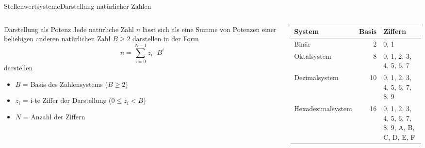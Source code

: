 \documentclass[xelatex,aspectratio=169]{beamer}
\begin{document}
\begin{frame}{Stellenwertsysteme}{Darstellung natürlicher Zahlen}
  \begin{columns}
    \begin{column}{0.5\textwidth}
      \begin{block}{Darstellung als Potenz}
        Jede natürliche Zahl \(n\) lässt sich als eine Summe von Potenzen einer beliebigen anderen natürlichen Zahl \(B \geq 2 \) darstellen in der Form
        \[
          n = \sum_{i=0}^{N-1} z_i \cdot B^i
        \]
        darstellen
        \begin{itemize}
          \item \(B\) = Basis des Zahlensystems (\(B \geq 2\))
          \item \(z_i\) = i-te Ziffer der Darstellung (\(0 \leq z_i < B\))
          \item \(N\) = Anzahl der Ziffern
        \end{itemize}
      \end{block}
    \end{column}
    \begin{column}{0.5\textwidth}
      \begin{tabularx}{\textwidth}{lrX}
        \toprule
        System            & Basis & Ziffern                                        \\
        \midrule
        Binär             & 2     & 0, 1                                           \\
        Oktalsystem       & 8     & 0, 1, 2, 3, 4, 5, 6, 7                         \\
        Dezimalsystem     & 10    & 0, 1, 2, 3, 4, 5, 6, 7, 8, 9                   \\
        Hexadezimalsystem & 16    & 0, 1, 2, 3, 4, 5, 6, 7, 8, 9, A, B, C, D, E, F \\
        \bottomrule
      \end{tabularx}
    \end{column}
  \end{columns}
\end{frame}
\end{document}
